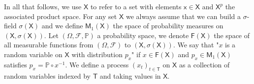 \documentclass{article}
\newcommand{\1}{\mathbbm{1}}
\begin{document}


In all that follows, we use $\mathsf{X}$ to refer to a set with elements $\mathsf{x} \in \mathsf{X}$ and $\mathsf{X}^p$ the associated product space.  For any set $\mathsf{X}$ we always assume that we can build a $\sigma$-field $\sigma(\mathsf{X})$ and we define $\mathsf{M}_1(\mathsf{X})$ the space of probability measures on $(\mathsf{X},\sigma(\mathsf{X}))$. Let $(\mathsf{\Omega},\mathcal{F},\mathbb{P})$ a probability space, we denote $\mathsf{F(X)}$ the space of all measurable functions from $(\mathsf{\Omega},\mathcal{F})$ to $(\mathsf{X},\sigma(\mathsf{X}))$. We say that "$x$ is a random variable on $\mathsf{X}$ with distribution $p_x$" if $x \in \mathsf{F(X)}$ and $p_x \in \mathsf{M}_1(\mathsf{X})$ satisfies $p_x = \mathbb{P} \circ x^{-1}$.  We define a process $(x_t)_{t \in \mathsf{T}}$ on $\mathsf{X}$ as a collection of random variables indexed by $\mathsf{T}$ and taking values in $\mathsf{X}$. 
\end{document}
